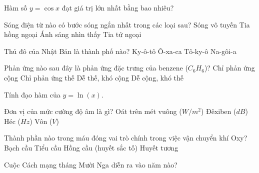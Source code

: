 \begin{ex}
    Hàm số $y = \cos x$ đạt giá trị lớn nhất bằng bao nhiêu?
\end{ex}

\begin{ex}
    Sóng điện từ nào có bước sóng ngắn nhất trong các loại sau?
    \choice
    {Sóng vô tuyến}
    {Tia hồng ngoại}
    {Ánh sáng nhìn thấy}
    {\True Tia tử ngoại}
\end{ex}

\begin{ex}
    Thủ đô của Nhật Bản là thành phố nào?
    \choice
    {Ky-ô-tô}
    {Ô-xa-ca}
    {\True Tô-ky-ô}
    {Na-gôi-a}
\end{ex}

\begin{ex}
    Phản ứng nào sau đây là phản ứng đặc trưng của benzene ($C_6H_6$)?
    \choice
    {Chỉ phản ứng cộng}
    {Chỉ phản ứng thế}
    {\True Dễ thế, khó cộng}
    {Dễ cộng, khó thế}
\end{ex}

\begin{ex}
    Tính đạo hàm của $y = \ln(x)$.
\end{ex}

\begin{ex}
    Đơn vị của mức cường độ âm là gì?
    \choice
    {Oát trên mét vuông ($W/m^2$)}
    {\True Đêxiben ($dB$)}
    {Héc ($Hz$)}
    {Vôn ($V$)}
\end{ex}

\begin{ex}
    Thành phần nào trong máu đóng vai trò chính trong việc vận chuyển khí Oxy?
    \choice
    {Bạch cầu}
    {Tiểu cầu}
    {\True Hồng cầu (huyết sắc tố)}
    {Huyết tương}
\end{ex}

\begin{ex}
    Cuộc Cách mạng tháng Mười Nga diễn ra vào năm nào?
\end{ex}

